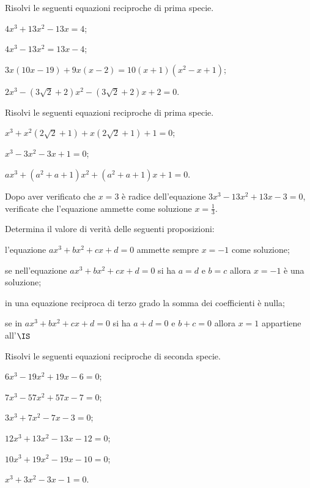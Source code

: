 \begin{esercizio}[\Ast]
\label{ese:5.39}
Risolvi le seguenti equazioni reciproche di prima specie.
\begin{enumeratea}
\item $4x^3+13x^2-13x=4$;
\item $4x^3-13x^2=13x-4$;
\item $3x(10x-19)+9x(x-2)=10(x+1)(x^2-x+1)$;
\item $2x^3-(3\sqrt 2+2)x^2-(3\sqrt 2+2)x+2=0$.
\end{enumeratea}
\end{esercizio}

\begin{esercizio}[\Ast]
\label{ese:5.40}
Risolvi le seguenti equazioni reciproche di prima specie.
\begin{enumeratea}
\item $x^3+x^2(2\sqrt 2+1)+x(2\sqrt 2+1)+1=0$;
\item $x^3-3x^2-3x+1=0$;
\item ${ax}^3+(a^2+a+1)x^2+(a^2+a+1)x+1=0$.
\end{enumeratea}
\end{esercizio}

 \begin{esercizio}[\Ast]
\label{ese:5.41}
Dopo aver verificato che $x=3$ è radice dell’equazione $3x^3-13x^2+13x-3=0$, verificate che l’equazione ammette come soluzione $x=\frac 1 3$.
 \end{esercizio}

\begin{esercizio}
\label{ese:5.42}
Determina il valore di verità delle seguenti proposizioni:
\begin{enumeratea}
\item l’equazione $ax^3+bx^2+cx+d=0$ ammette sempre $x=-1$ come soluzione;
\item se nell’equazione $ax^3+bx^2+cx+d=0$ si ha $a=d$ e $b=c$ allora $x=-1$ è una soluzione;
\item in una equazione reciproca di terzo grado la somma dei coefficienti è nulla;
\item se in $ax^3+bx^2+cx+d=0$ si ha $a+d=0$ e $b+c=0$ allora $x=1$ appartiene all’$\IS$
\end{enumeratea}
\end{esercizio}

\begin{esercizio}[\Ast]
\label{ese:5.43}
Risolvi le seguenti equazioni reciproche di seconda specie.
\begin{multicols}{2}
\begin{enumeratea}
\item $6x^3-19x^2+19x-6=0$;
\item $7x^3-57x^2+57x-7=0$;
\item $3x^3+7x^2-7x-3=0$;
\item $12x^3+13x^2-13x-12=0$;
\item $10x^3+19x^2-19x-10=0$;
\item $x^3+3x^2-3x-1=0$.
\end{enumeratea}
\end{multicols}
\end{esercizio}

